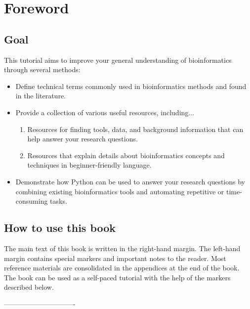 \maketitle 
\listoftodos
\tableofcontents %

\chapter{Foreword}

\section{Goal}
This tutorial aims to improve your general understanding of bioinformatics through several methods:
\begin{itemize}
    \item Define technical terms commonly used in bioinformatics methods and found in the literature.
    \item Provide a collection of various useful resources, including...
    \begin{enumerate}
        \item Resources for finding tools, data, and background information that can help answer your research questions.
        \item Resources that explain details about bioinformatics concepts and techniques in beginner-friendly language.
    \end{enumerate}
    \item Demonstrate how Python can be used to answer your research questions by combining existing bioinformatics tools and automating repetitive or time-consuming tasks.
\end{itemize}

\section{How to use this book}
The main text of this book is written in the right-hand margin. The left-hand margin contains special markers and important notes to the reader. Most reference materials are consolidated in the appendices at the end of the book. The book can be used as a self-paced tutorial with the help of the markers described below.

------------------------------- 

